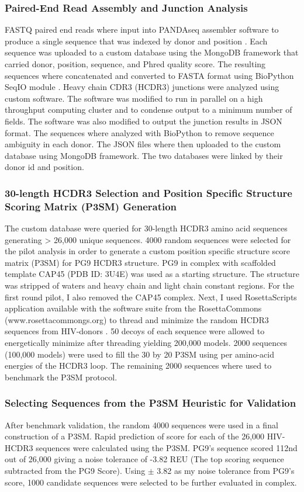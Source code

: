 \subsubsection{Paired-End Read Assembly and Junction Analysis}
FASTQ paired end reads where input into PANDAseq assembler software to produce a single sequence that was indexed by donor and position \citep{Bartram:2011cz}. Each sequence was uploaded to a custom database using the MongoDB framework that carried donor, position, sequence, and Phred quality score. The resulting sequences where concatenated and converted to FASTA format using BioPython SeqIO module \citep{Cock:2009hj}. Heavy chain CDR3 (HCDR3) junctions were analyzed using custom software. The software was modified to run in parallel on a high throughput computing cluster and to condense output to a minimum number of fields. The software was also modified to output the junction results in JSON format. The sequences where analyzed with BioPython to remove sequence ambiguity in each donor. The JSON files where then uploaded to the custom database using MongoDB framework. The two databases were linked by their donor id and position.

\subsubsection{30-length HCDR3 Selection and Position Specific Structure Scoring Matrix (P3SM) Generation}
The custom database were queried for 30-length HCDR3 amino acid sequences generating > 26,000 unique sequences. 4000 random sequences were selected for the pilot analysis in order to generate a custom position specific structure score matrix (P3SM) for PG9 HCDR3 structure. PG9 in complex with scaffolded template CAP45 (PDB ID: 3U4E) was used as a starting structure. The structure was stripped of waters and heavy chain and light chain constant regions. For the first round pilot, I also removed the CAP45 complex. Next, I used RosettaScripts application available with the software suite from the RosettaCommons (www.rosettacommongs.org) to thread and minimize the random HCDR3 sequences from HIV-\naive donors \citep{Fleishman:2011ji}. 50 decoys of each sequence were allowed to energetically minimize after threading yielding 200,000 models. 2000 sequences (100,000 models) were used to fill the 30 by 20 P3SM using \rosetta per amino-acid energies of the HCDR3 loop. The remaining 2000 sequences where used to benchmark the P3SM protocol.

\subsubsection{Selecting Sequences from the P3SM Heuristic for Validation}
After benchmark validation, the random 4000 sequences were used in a final construction of a P3SM. Rapid prediction of score for each of the 26,000 HIV-\naive HCDR3 sequences were calculated using the P3SM. PG9's sequence scored 112nd out of 26,000 giving a noise tolerance of -3.82 REU (The top scoring sequence subtracted from the PG9 Score). Using $\pm$ 3.82 as my noise tolerance from PG9's score, 1000 candidate sequences were selected to be further evaluated in complex.

